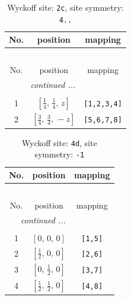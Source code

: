 \documentclass[fleqn,8pt]{jsarticle}
\begin{document}
\renewcommand{\arraystretch}{1.2}
\begin{longtable}{ccc}
\caption{Wyckoff site: {\tt 2c}, site symmetry: {\tt 4..}}
 \\
 \hline \hline
No. & position & mapping \\ \hline \endfirsthead

\multicolumn{2}{l}{\tablename\ \thetable{}} \\
 \hline \hline
No. & position & mapping \\ \hline \endhead

 \hline \hline
\multicolumn{2}{r}{\footnotesize\it continued ...} \\ \endfoot

 \hline \hline
\multicolumn{2}{r}{} \\ \endlastfoot

1 & $\left[ \frac{1}{4},\, \frac{1}{4},\, z \right]$ & {\tt [1,2,3,4]} \\ \hline
2 & $\left[ \frac{3}{4},\, \frac{3}{4},\, - z \right]$ & {\tt [5,6,7,8]} \\
\end{longtable}
\renewcommand{\arraystretch}{1.2}
\begin{longtable}{ccc}
\caption{Wyckoff site: {\tt 4d}, site symmetry: {\tt -1}}
 \\
 \hline \hline
No. & position & mapping \\ \hline \endfirsthead

\multicolumn{2}{l}{\tablename\ \thetable{}} \\
 \hline \hline
No. & position & mapping \\ \hline \endhead

 \hline \hline
\multicolumn{2}{r}{\footnotesize\it continued ...} \\ \endfoot

 \hline \hline
\multicolumn{2}{r}{} \\ \endlastfoot

1 & $\left[ 0,\, 0,\, 0 \right]$ & {\tt [1,5]} \\ \hline
2 & $\left[ \frac{1}{2},\, 0,\, 0 \right]$ & {\tt [2,6]} \\ \hline
3 & $\left[ 0,\, \frac{1}{2},\, 0 \right]$ & {\tt [3,7]} \\ \hline
4 & $\left[ \frac{1}{2},\, \frac{1}{2},\, 0 \right]$ & {\tt [4,8]} \\
\end{longtable}
\renewcommand{\arraystretch}{1.2}
\end{document}
